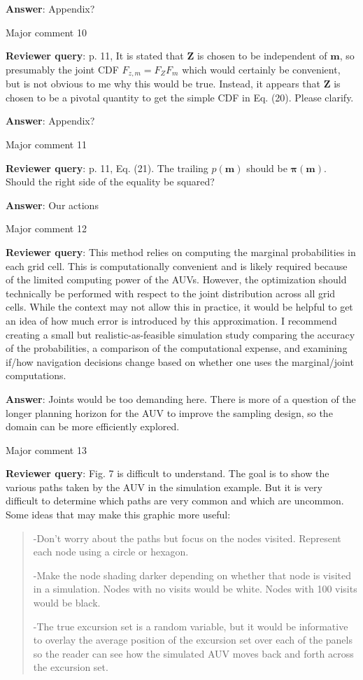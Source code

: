 \documentclass[a4paper]{article}
\newcommand{\bm}{ {\boldsymbol m} }
\newcommand{\bZ}{ {\boldsymbol Z} }
\newcommand{\bpi}{ {\boldsymbol \pi} }
\def\reply{\textbf{Reviewer query}}
\def\action{\textbf{Answer}}
\begin{document}
\begin{answers}
\action: Appendix? 

\item{Major comment 10}\label{r2c10}

\reply: p. 11, It is stated that $\bZ$ is chosen to be independent of $\bm$, so presumably the joint CDF $F_{z,m}=F_{Z}F_m$ which would certainly be convenient, but is not obvious to me why this would be true. 
Instead, it appears that $\bZ$ is chosen to be a pivotal quantity to get the simple CDF in Eq. (20). Please clarify.

\action: Appendix? 

\item{Major comment 11}\label{r2c11}

\reply: p. 11, Eq. (21). The trailing $p(\bm)$ should be $\bpi(\bm)$. Should the right side of the equality be squared? 

\action: Our actions

\item{Major comment 12}\label{r2c12}

\reply: This method relies on computing the marginal probabilities in each grid cell. This is computationally convenient and is likely required because of the limited computing power of the AUVs. However, the optimization should technically be performed with respect to the joint distribution across all grid cells. While the context may not allow this in practice, it would be helpful to get an idea of how much error is introduced by this approximation. I recommend creating a small but realistic-as-feasible simulation study comparing the accuracy of the probabilities, a comparison of the computational expense, and examining if/how navigation decisions change based on whether one uses the marginal/joint computations. 

\action: Joints would be too demanding here. There is more of a question of the longer planning horizon for the AUV to improve the sampling design, so the domain can be more efficiently explored. 

\item{Major comment 13}\label{r2c13}

\reply: Fig. 7 is difficult to understand. The goal is to show the various paths taken by the AUV in the
simulation example. But it is very difficult to determine which paths are very common and which
are uncommon. Some ideas that may make this graphic more useful:

\begin{quote}
-Don’t worry about the paths but focus on the nodes visited. Represent each node using a circle or hexagon.\par
-Make the node shading darker depending on whether that node is visited in a
simulation. Nodes with no visits would be white. Nodes with 100 visits would be black.\par
-The true excursion set is a random variable, but it would be informative to overlay the
average position of the excursion set over each of the panels so the reader can see how
the simulated AUV moves back and forth across the excursion set.
\end{quote}


\end{answers}
\end{document}
